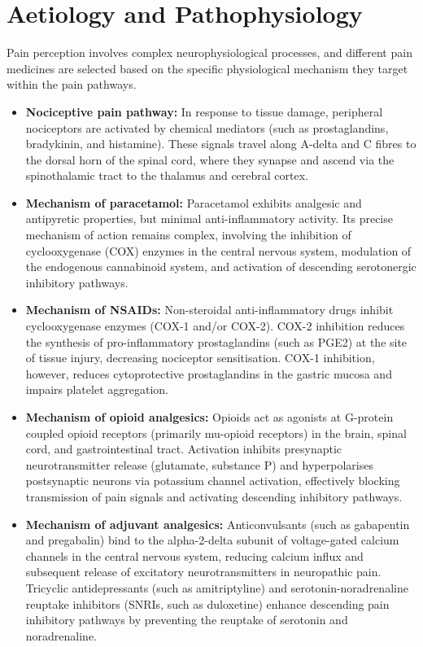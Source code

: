 \section*{Aetiology and Pathophysiology}
Pain perception involves complex neurophysiological processes, and different pain medicines are selected based on the specific physiological mechanism they target within the pain pathways.
\begin{itemize}
    \item \textbf{Nociceptive pain pathway:} In response to tissue damage, peripheral nociceptors are activated by chemical mediators (such as prostaglandins, bradykinin, and histamine). These signals travel along A-delta and C fibres to the dorsal horn of the spinal cord, where they synapse and ascend via the spinothalamic tract to the thalamus and cerebral cortex.
    \item \textbf{Mechanism of paracetamol:} Paracetamol exhibits analgesic and antipyretic properties, but minimal anti-inflammatory activity. Its precise mechanism of action remains complex, involving the inhibition of cyclooxygenase (COX) enzymes in the central nervous system, modulation of the endogenous cannabinoid system, and activation of descending serotonergic inhibitory pathways.
    \item \textbf{Mechanism of NSAIDs:} Non-steroidal anti-inflammatory drugs inhibit cyclooxygenase enzymes (COX-1 and/or COX-2). COX-2 inhibition reduces the synthesis of pro-inflammatory prostaglandins (such as PGE2) at the site of tissue injury, decreasing nociceptor sensitisation. COX-1 inhibition, however, reduces cytoprotective prostaglandins in the gastric mucosa and impairs platelet aggregation.
    \item \textbf{Mechanism of opioid analgesics:} Opioids act as agonists at G-protein coupled opioid receptors (primarily mu-opioid receptors) in the brain, spinal cord, and gastrointestinal tract. Activation inhibits presynaptic neurotransmitter release (glutamate, substance P) and hyperpolarises postsynaptic neurons via potassium channel activation, effectively blocking transmission of pain signals and activating descending inhibitory pathways.
    \item \textbf{Mechanism of adjuvant analgesics:} Anticonvulsants (such as gabapentin and pregabalin) bind to the alpha-2-delta subunit of voltage-gated calcium channels in the central nervous system, reducing calcium influx and subsequent release of excitatory neurotransmitters in neuropathic pain. Tricyclic antidepressants (such as amitriptyline) and serotonin-noradrenaline reuptake inhibitors (SNRIs, such as duloxetine) enhance descending pain inhibitory pathways by preventing the reuptake of serotonin and noradrenaline.
\end{itemize}

